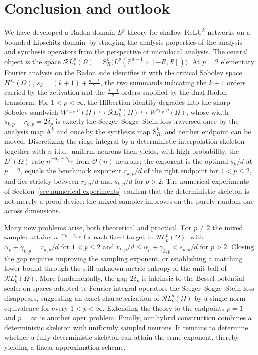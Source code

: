 \documentclass[12pt]{article}
\numberwithin{equation}{section}
\numberwithin{figure}{section}
\numberwithin{equation}{section}
\begin{document}
\section{Conclusion and outlook}
\label{sec:conclusion}

We have developed a Radon-domain $L^p$ theory for shallow $\mathrm{ReLU}^k$
networks on a bounded Lipschitz domain, by studying the analysis properties of
the analysis and synthesis operators from the perspective of microlocal analysis.  
The central object is the space
$\mathcal{R}L^p_k(\Omega)=\mathrm{S}^k_R\bigl(L^p(\mathbb{S}^{d-1}\times[-R,R])\bigr)$. 
At $p=2$ elementary Fourier analysis on the Radon
side identifies it with the critical Sobolev space $H^{s_k}(\Omega)$,
$s_k=(k+1)+\tfrac{d-1}{2}$, the two summands indicating the $k+1$ orders carried
by the activation and the $\tfrac{d-1}{2}$ orders supplied by the dual Radon
transform.  For $1<p<\infty$, the Hilbertian identity degrades into the sharp
Sobolev sandwich
$W^{s_{k,p},p}(\Omega)\hookrightarrow\mathcal{R}L^p_k(\Omega)\hookrightarrow
W^{r_{k,p},p}(\Omega)$, whose width $s_{k,p}-r_{k,p}=2\delta_p$ is exactly the
Seeger--Sogge--Stein loss traversed once by the analysis map $\mathrm{A}^k$ and
once by the synthesis map $\mathrm{S}^k_R$, and neither endpoint can be moved.
Discretizing the ridge integral by a deterministic interpolation skeleton
together with $n$ i.i.d.\ uniform neurons then yields, with high probability,
the $L^p(\Omega)$ rate $n^{-\alpha_p-\gamma_{k,p}}$ from $\mathcal O(n)$
neurons; the exponent is the optimal $s_k/d$ at $p=2$, equals the benchmark
exponent $r_{k,p}/d$ of the right endpoint for $1<p\le2$, and lies strictly
between $r_{k,p}/d$ and $s_{k,p}/d$ for $p>2$.  The numerical experiments of
Section~\ref{sec:numerical-experiments} confirm that the deterministic skeleton
is not merely a proof device: the mixed sampler improves on the purely random
one across dimensions.

Many new problems arise, both theoretical and practical. For $p\neq2$ the mixed
sampler attains $n^{-\alpha_p-\gamma_{k,p}}$ for each fixed target in $\mathcal{R}L^p_k(\Omega)$,
with $\alpha_p+\gamma_{k,p}=r_{k,p}/d$ for $1<p\le2$ and
$r_{k,p}/d\le\alpha_p+\gamma_{k,p}<s_{k,p}/d$ for $p>2$. Closing the gap requires
improving the sampling exponent, or establishing a matching lower bound through 
the still-unknown metric entropy of the unit ball of $\mathcal{R}L^p_k(\Omega)$.  
More fundamentally, the gap $2\delta_p$ is
intrinsic to the Bessel-potential scale: on spaces adapted to Fourier integral
operators the Seeger--Sogge--Stein loss disappears, suggesting an exact
characterization of $\mathcal{R}L^p_k(\Omega)$ by a single norm equivalence for
every $1<p<\infty$.  Extending the theory to the endpoints $p=1$ and
$p=\infty$ is another open problem.  Finally, our hybrid construction combines
a deterministic skeleton with uniformly sampled neurons. It remains to
determine whether a fully
deterministic skeleton can attain the same exponent, thereby yielding a linear
approximation scheme.
\end{document}
